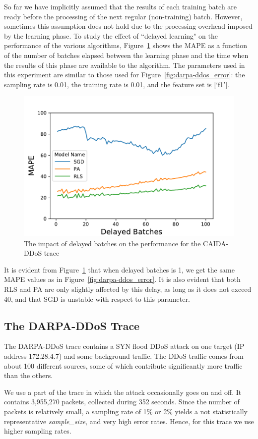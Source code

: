 So far we have implicitly assumed that the results of each training batch are ready
before the processing of the next regular (non-training) batch. However, sometimes this assumption does not hold
due to the processing overhead imposed by the learning phase. To study the effect of ``delayed learning"
on the performance of the various algorithms, Figure~\ref{fig:caida-ddos_delayed_batches} shows the MAPE as a function
of the number of batches elapsed between the learning phase and the time when the results of this phase are
available to the algorithm. 
The parameters used in this experiment are similar to those used for 
Figure~\ref{fig:darpa-ddos_error}: the sampling rate is 0.01, the training rate is 0.01, and the feature set is [‘f1’].
\begin{figure}[!t]
\centering
\includegraphics[width=.49\textwidth]{img/caida-ddos_delayed_batches.pdf}
\caption{The impact of delayed batches on the performance for the CAIDA-DDoS trace}
\label{fig:caida-ddos_delayed_batches}
\end{figure}
It is evident from Figure~\ref{fig:caida-ddos_delayed_batches} that
when delayed batches is 1, we get the same MAPE values as in Figure~\ref{fig:darpa-ddos_error}. 
It is also evident that both RLS and PA are only slightly affected by this delay, as long as it does not exceed 40, and 
that SGD is unstable with respect to this parameter.  



	\subsection{The DARPA-DDoS Trace}

		The DARPA-DDoS trace \cite{darpaddos} contains a SYN flood DDoS attack on one target (IP address 172.28.4.7) and some background traffic. The DDoS traffic comes from about 100 different sources, some of which contribute significantly more traffic than the others.
		
		We use a part of the trace in which the attack occasionally goes on and off. It contains 3,955,270 packets, collected during 352 seconds. Since the number of packets is relatively small, a sampling rate of 1\% or 2\% yields a not statistically representative \emph{sample\_size}, and very high error rates. Hence, for this trace we use higher sampling rates.%
		
